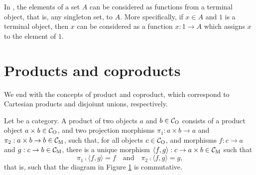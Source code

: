 \begin{example}
  \label{ex:terminal-objects-constants}


  In \set, the elements of a set $A$ can be considered as functions
  from a terminal object, that is, any singleton set, to $A$. More
  specifically, if $x \in A$ and $1$ is a terminal object, then $x$
  can be considered as a function $x: 1 \to A$ which assigns $x$ to
  the element of $1$.

\end{example}

\section{Products and coproducts}
\label{sec:constructions-products-coproducts}

We end with the concepts of product and coproduct, which correspond to
Cartesian products and disjoiunt unions, respectively.

\begin{definition}
  \label{def:product}


  Let  be a category. A product of two objects $a$ and $b \in
  \mathcal{C}_{\operatorname{O}}$ consists of a product object $a \times b \in \mathcal{C}_{\operatorname{O}}$,
  and two projection morphisms $\pi_{1}: a \times b \to a$ and
  $\pi_{2}: a \times b \to b \in \mathcal{C}_{\operatorname{M}}$, such that, for all objects
  $c \in \mathcal{C}_{\operatorname{O}}$, and morphisms $f: c \to a$ and $g: c \to b \in
  \mathcal{C}_{\operatorname{M}}$, there is a unique morphism $\langle{f,g}\rangle: c \to a
  \times b \in \mathcal{C}_{\operatorname{M}}$ such that
  \begin{equation}
    \label{eq:product}
    \pi_{1} \comp \langle{f,g}\rangle = f
    \quad
    \text{and}
    \quad
    \pi_{2} \comp \langle{f,g}\rangle = g
    \text{,}
  \end{equation}
  that is, such that the diagram in Figure \ref{fig:product} is
  commutative.
  \begin{figure}[htbp]
    \begin{center}
    \end{center}
    \caption{}
    \label{fig:product}
  \end{figure}

\end{definition}

